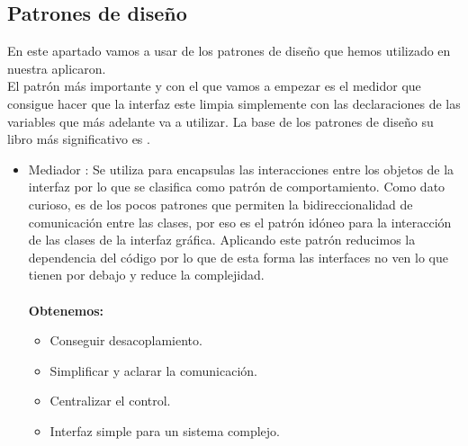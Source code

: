 \subsection{Patrones de diseño}
En este apartado vamos a usar de los patrones de diseño que hemos utilizado en nuestra aplicaron.\\
El patrón más importante y con el que vamos a empezar es el medidor que consigue hacer que la interfaz este limpia simplemente con las declaraciones de las variables que más adelante va a utilizar.
La base de los patrones de diseño su libro más significativo es \cite{Hunt2013}.
\begin{itemize}
\item Mediador \cite{wiki:Mediador}: Se utiliza para encapsulas las interacciones entre los objetos de la interfaz por lo que se clasifica como patrón de comportamiento.
Como dato curioso, es de los pocos patrones que permiten la bidireccionalidad de comunicación entre las clases, por eso es el patrón idóneo para la interacción de las clases de la interfaz gráfica.
Aplicando este patrón reducimos la dependencia del código por lo que de esta forma las interfaces no ven lo que tienen por debajo y reduce la complejidad.\\\\
\textbf{Obtenemos:}
\begin{itemize}
\item Conseguir desacoplamiento.
\item Simplificar y aclarar la comunicación.
\item Centralizar el control.
\item Interfaz simple para un sistema complejo.
\end{itemize}


\end{itemize}
